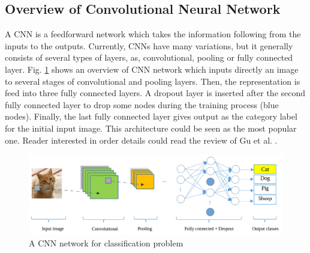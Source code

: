 \documentclass[review]{elsarticle}
\begin{document}
\subsection{Overview of Convolutional Neural Network}
A CNN is a feedforward network which takes the information following from the inputs to the outputs. Currently, CNNs have many variations, but it generally consists of several types of layers, as, convolutional, pooling or fully connected layer. Fig. \ref{imgcnn_network} shows an overview of CNN network which inputs directly an image to several stages of convolutional and pooling layers. Then, the representation is feed into three fully connected layers. A dropout layer is inserted after the second fully connected layer to drop some nodes during the training process (blue nodes). Finally, the last fully connected layer gives output as the category label for the initial input image. This architecture could be seen as the most popular one. Reader interested in order details could read the review of Gu et al. \cite{gu2018recent}. 

\begin{figure}[!h]
	\centering
	\includegraphics[scale=.3]{images/cnn_network_2}
	\caption{A CNN network for classification problem}
	\label{imgcnn_network}
\end{figure}
\end{document}
